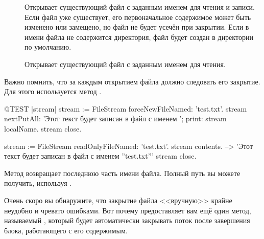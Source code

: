 \documentclass[a4paper,10pt,twoside]{book}
\begin{document}
\begin{description}
\item[] Открывает существующий файл с заданным именем для чтения и записи. Если файл уже существует, его первоначальное содержимое может быть изменено или замещено, но файл не будет усечён при закрытии. Если в имени файла не содержится директория, файл будет создан в директории по умолчанию. 
\item[] Открывает существующий файл с заданным именем для чтения. 
\end{description}

Важно помнить, что за каждым открытием файла должно следовать его закрытие. Для этого используется метод .

\begin{code}{@TEST |stream|}
stream := FileStream forceNewFileNamed: 'test.txt'.
stream
    nextPutAll: 'Этот текст будет записан в файл с именем ';
    print: stream localName.
stream close.

stream := FileStream readOnlyFileNamed: 'test.txt'.
stream contents. --> 'Этот текст будет записан в файл с именем ''test.txt'''
stream close.
\end{code}



Метод  возвращает последнюю часть имени файла. Полный путь вы можете получить, используя .

Очень скоро вы обнаружите, что закрытие файла <<вручную>> крайне неудобно и чревато ошибками. Вот почему  предоставляет вам ещё один метод, называемый , который будет автоматически закрывать поток после завершения блока, работающего с его содержимым.
\end{document}
